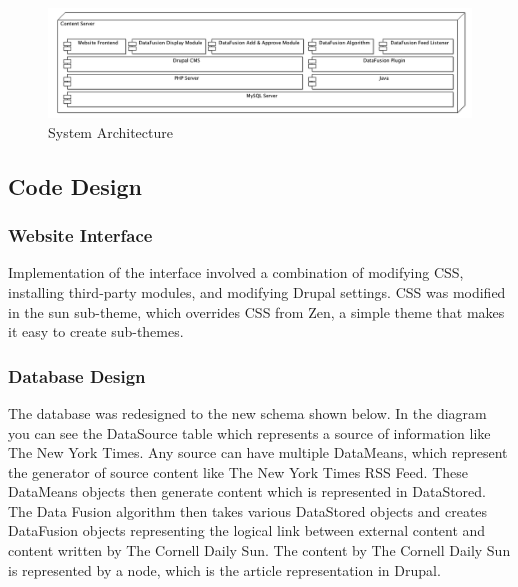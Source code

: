 \documentclass[11pt]{article} %
\begin{document}
\begin{figure}[htbp]
\begin{center}
\includegraphics[width=\columnwidth]{images/software_stack}
\caption{System Architecture}
\end{center}
\end{figure}

\subsection{Code Design}

\subsubsection{Website Interface}

Implementation of the interface involved a combination of modifying CSS, installing third-party modules, and modifying Drupal settings. CSS was modified in the sun sub-theme, which overrides CSS from Zen, a simple theme that makes it easy to create sub-themes.

\subsubsection{Database Design}

The database was redesigned to the new schema shown below. In the diagram you can see the DataSource table which represents a source of information like The New York Times. Any source can have multiple DataMeans, which represent the generator of source content like The New York Times RSS Feed. These DataMeans objects then generate content which is represented in DataStored. The Data Fusion algorithm then takes various DataStored objects and creates DataFusion objects representing the logical link between external content and content written by The Cornell Daily Sun. The content by The Cornell Daily Sun is represented by a node, which is the article representation in Drupal.
\end{document}
